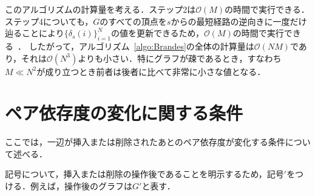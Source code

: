このアルゴリズムの計算量を考える．ステップ2は$\mathcal{O}(M)$の時間で実行できる．
ステップ4についても，$G$のすべての頂点を$s$からの最短経路の逆向きに一度だけ辿ることにより$\{\delta_s(i)\}_{i=1}^N$の値を更新できるため，$\mathcal{O}(M)$の時間で実行できる~\cite{Brandes2001}．
したがって，アルゴリズム~\ref{algo:Brandes}の全体の計算量は$\mathcal{O}(NM)$であり，それは$\mathcal{O}(N^3)$よりも小さい．特にグラフが疎であるとき，すなわち$M \ll N^2$が成り立つとき前者は後者に比べて非常に小さな値となる．


\section{ペア依存度の変化に関する条件}
ここでは，一辺が挿入または削除されたあとのペア依存度が変化する条件について述べる．

記号について，挿入または削除の操作後であることを明示するため，記号$'$をつける．例えば，操作後のグラフは$G'$と表す．

